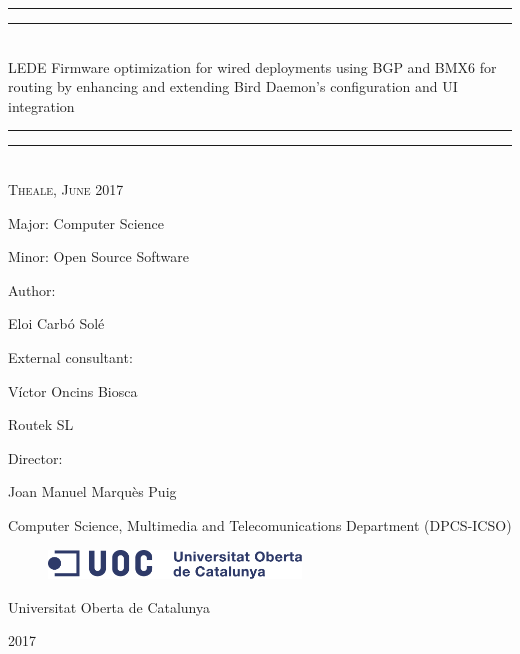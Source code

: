 \begin{titlepage}
    \centering
    \vspace*{\baselineskip}
    \rule{\textwidth}{1.6pt}\vspace*{-\baselineskip}\vspace*{2pt}
    \rule{\textwidth}{0.4pt}\\[\baselineskip]
    {\LARGE LEDE Firmware optimization for wired deployments using BGP and BMX6 for routing by enhancing and extending Bird Daemon's configuration and UI integration}
    \rule{\textwidth}{0.4pt}\vspace*{-\baselineskip}\vspace{3.2pt}
    \rule{\textwidth}{1.6pt}\\[\baselineskip]
    \scshape
    Theale, June 2017\par
    \vspace*{2\baselineskip}
    Major: Computer Science\par
    Minor: Open Source Software\par
    \vspace*{2\baselineskip}
    Author: \\
    {\Large Eloi Carb\'{o} Sol\'{e}\par}
    \vspace*{1\baselineskip}
    External consultant: \\
    {\large V\'{i}ctor Oncins Biosca\par}
    Routek SL\par
    \vspace*{1\baselineskip}
    Director: \\ 
    {\large Joan Manuel Marqu\`{e}s Puig\par}
    Computer Science, Multimedia and Telecomunications Department (DPCS-ICSO)
    \vfill
    \begin{figure}[ht!]
        \centering
        \includegraphics[width=0.6\textwidth]{images/logo}
	\end{figure}
    {\large Universitat Oberta de Catalunya}\par
    {\scshape 2017}
\end{titlepage}

\thispagestyle{empty}
\newpage
\newpage\leavevmode


\newpage




\cleardoublepage

\pagestyle{plain}


\def\contentsname{Index}
\tableofcontents
\newpage

\listoffigures
\newpage
\lstlistoflistings

